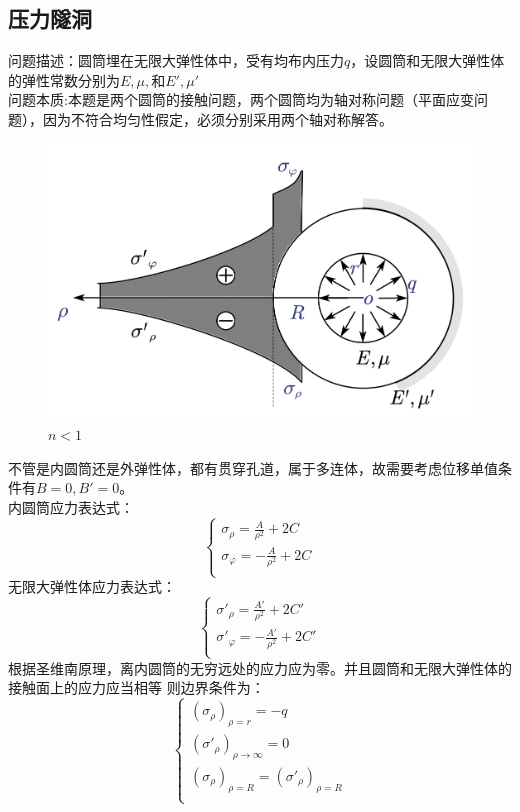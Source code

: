 \subsection{压力隧洞}
问题描述：圆筒埋在无限大弹性体中，受有均布内压力$q$，设圆筒和无限大弹性体的弹性常数分别为$E,\mu,\text{和}E',\mu'$\\
\hspace*{2em}问题本质:本题是两个圆筒的接触问题，两个圆筒均为轴对称问题（平面应变问题），因为不符合均匀性假定，必须分别采用两个轴对称解答。
\begin{figure}[H]
	\centering
	\includegraphics[scale=0.5]{figure/4-7.png}
	\caption{$n<1$}
\end{figure}
不管是内圆筒还是外弹性体，都有贯穿孔道，属于多连体，故需要考虑位移单值条件有$B=0,B'=0$。\\
内圆筒应力表达式：\[\begin{cases}
\sigma _{\rho}=\frac{A}{\rho ^2}+2C\\
\sigma _{\varphi}=-\frac{A}{\rho ^2}+2C\\
\end{cases}\]
无限大弹性体应力表达式：\[\begin{cases}
\sigma '_{\rho}=\frac{A'}{\rho ^2}+2C'\\
\sigma '_{\varphi}=-\frac{A'}{\rho ^2}+2C'\\
\end{cases}\]
根据圣维南原理，离内圆筒的无穷远处的应力应为零。并且圆筒和无限大弹性体的接触面上的应力应当相等
则边界条件为：\[\begin{cases}
\left( \sigma _{\rho} \right) _{\rho =r}=-q\\
\left( \sigma '_{\rho} \right) _{\rho \rightarrow \infty}=0\\
\left( \sigma _{\rho} \right) _{\rho =R}=\left( \sigma '_{\rho} \right) _{\rho =R}\\
\end{cases}\]
